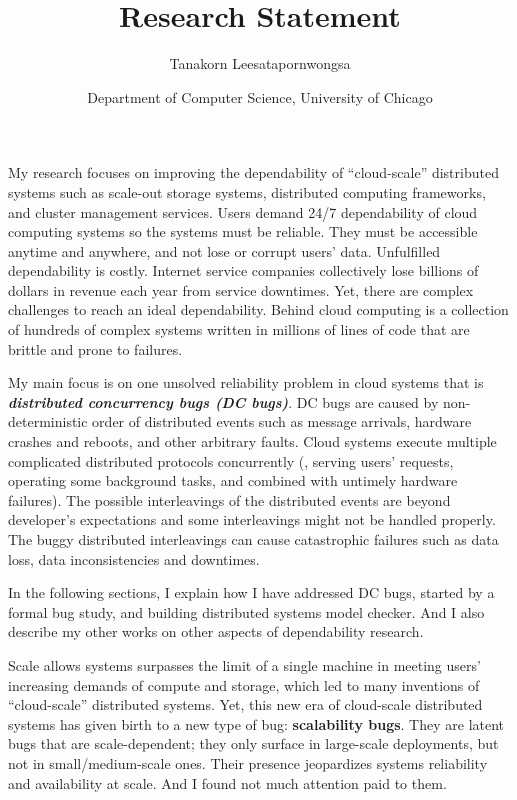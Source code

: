 \documentclass[11pt]{article}
\begin{document}
\title{Research Statement}
\author{Tanakorn Leesatapornwongsa}
\date{\vspace{-1ex} \small{Department of Computer Science, University of
Chicago}}

\maketitle

My research focuses on improving the dependability of ``cloud-scale''
distributed systems such as scale-out storage systems, distributed computing
frameworks, and cluster management services. Users demand 24/7 dependability of
cloud computing systems so the systems must be reliable. They must be
accessible anytime and anywhere, and not lose or corrupt users' data.
Unfulfilled dependability is costly. Internet service companies collectively
lose billions of dollars in revenue each year from service downtimes. Yet,
there are complex challenges to reach an ideal dependability. Behind cloud
computing is a collection of hundreds of complex systems written in millions of
lines of code that are brittle and prone to failures.

My main focus is on one unsolved reliability problem in cloud systems that is
\textbf{\textit{distributed concurrency bugs (DC bugs)}}. DC bugs are caused by
non-deterministic order of distributed events such as message arrivals,
hardware crashes and reboots, and other arbitrary faults. Cloud systems execute
multiple complicated distributed protocols concurrently (\eg, serving users'
requests, operating some background tasks, and combined with untimely hardware
failures). The possible interleavings of the distributed events are beyond
developer's expectations and some interleavings might not be handled properly.
The buggy distributed interleavings can cause catastrophic failures such as
data loss, data inconsistencies and downtimes.

In the following sections, I explain how I have addressed DC bugs, started by a
formal bug study, and building distributed systems model checker. And I also
describe my other works on other aspects of dependability research.

Scale allows systems surpasses the limit of a single machine in meeting
users' increasing demands of compute and storage, which led to many inventions
of ``cloud-scale'' distributed systems. Yet, this new era of cloud-scale
distributed systems has given birth to a new type of bug: \textbf{scalability
bugs}. They are latent bugs that are scale-dependent; they only surface in
large-scale deployments, but not in small/medium-scale ones. Their presence
jeopardizes systems reliability and availability at scale. And I found not much
attention paid to them.
\fi
\end{document}
